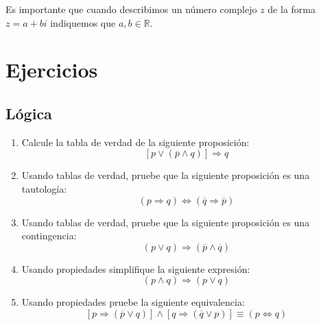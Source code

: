 \documentclass[11pt, twoside]{book}%
\begin{document}
\begin{note}
    Es importante que cuando describimos un número complejo \(z\) de la forma \(z=a+bi\) indiquemos que \(a,b\in\mathbb{R}\).
\end{note}

\newpage
\section{Ejercicios}
\subsection*{Lógica}
\begin{enumerate}
    \item Calcule la tabla de verdad de la siguiente proposición:
            \[\left[p\vee(\overline{p}\wedge q)\right]\Rightarrow q\]
    \item Usando tablas de verdad, pruebe que la siguiente proposición es una tautología:
        \[\left(p\Rightarrow q\right) \iff \left(\overline{q}\Rightarrow \overline{p}\right)\]
    \item Usando tablas de verdad, pruebe que la siguiente proposición es una contingencia:
        \[(p\vee q) \Rightarrow (\overline{p}\wedge \overline{q})\] 
    \item Usando propiedades simplifique la siguiente expresión:
        \[(p\wedge q)\Rightarrow (p\vee q)\]
    \item Usando propiedades pruebe la siguiente equivalencia:
        \[\left[p\Rightarrow(\overline{p}\vee q)\right]\wedge\left[q\Rightarrow(\overline{q}\vee p)\right]\equiv (p\iff q)\]
\end{enumerate}
\end{document}
